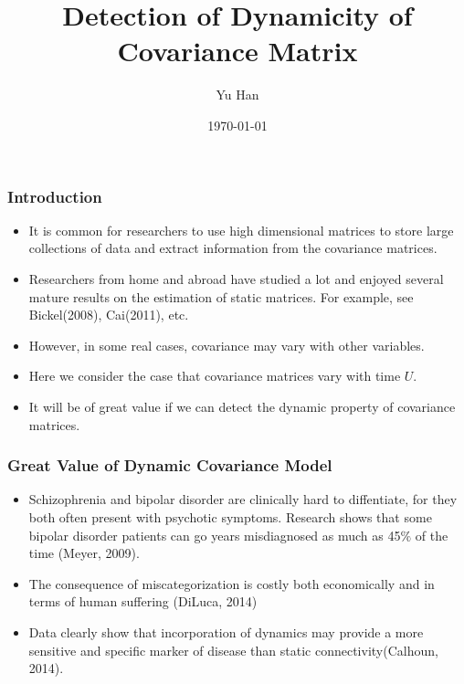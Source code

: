 \documentclass{beamer}
\title[Advanced Applied　Statistics]{Detection of Dynamicity of Covariance Matrix} %
\author{Yu Han} %
\institute[RUC] %
{
	Institute of Statistics and Big Data\\
	Renmin University of China \\ %
	\medskip
}
\date{\today} %
\begin{document}
	
	\begin{frame}
	\titlepage %
\end{frame}




\begin{frame}
\frametitle{Introduction}
\begin{itemize}
	\item It is common for researchers to use high dimensional matrices to store large collections of data and extract information from the covariance matrices.
	\item Researchers from home and abroad have studied a lot and enjoyed several mature results on the estimation of static matrices. For example, see Bickel(2008), Cai(2011), etc.
	\item However, in some real cases, covariance may vary with other variables. 
	\item Here we consider the case that covariance matrices vary with time $U$.
	\item It will be of great value if we can detect the dynamic property of covariance matrices.
\end{itemize}
\end{frame}


\begin{frame}
\frametitle{Great Value of Dynamic Covariance Model}
\begin{itemize}
\item Schizophrenia and bipolar disorder are clinically hard to diffentiate, for they both often present with psychotic symptoms. Research shows that some bipolar disorder patients can go years misdiagnosed as much as 45$\%$ of the time (Meyer, 2009). 
\item The consequence of miscategorization is costly both economically and in terms of human suffering (DiLuca, 2014)
\item Data clearly show that incorporation of dynamics may provide a more sensitive and specific marker of disease than static connectivity(Calhoun, 2014).


\end{itemize}
\end{frame}
\end{document}
